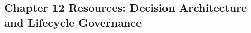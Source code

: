 \begin{refsection}
\chapter{Chapter 12 Resources: Decision Architecture and Lifecycle Governance}
\label{chap:comp-ch12}



\printbibliography[heading=subbibliography,title={Chapter 12 References}]
\end{refsection}
